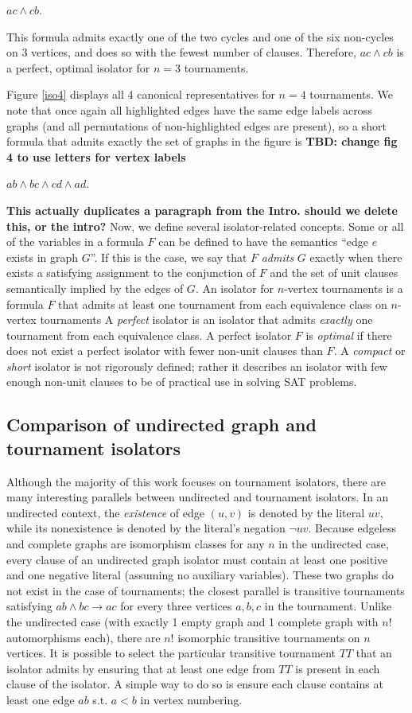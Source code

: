 \documentclass[conference]{IEEEtran}
\begin{document}
$ac \land cb$.

This formula admits exactly one of the two cycles and one of the six non-cycles on 3 vertices, and does so with the fewest number of clauses. Therefore, $ac \land cb$ is a perfect, optimal isolator for $n=3$ tournaments.

Figure \ref{iso4} displays all 4 canonical representatives for $n=4$ tournaments. We note that once again all highlighted edges have the same edge labels across graphs (and all permutations of non-highlighted edges are present), so a short formula that admits exactly the set of graphs in the figure is \textbf{TBD: change fig 4 to use letters for vertex labels}

$ab \land bc \land cd \land ad$.


\textbf{This actually duplicates a paragraph from the Intro. should we delete this, or the intro?}
Now, we define several isolator-related concepts.
Some or all of the variables in a formula $F$ can be defined to have the semantics ``edge $e$ exists in graph $G$''. If this is the case, we say that $F$ \emph{admits} $G$ exactly when there exists a satisfying assignment to the conjunction of $F$ and the set of unit clauses semantically implied by the edges of $G$.
An isolator for $n$-vertex tournaments is a formula $F$ that admits at least one tournament from each equivalence class on $n$-vertex tournaments
A \emph{perfect} isolator is an isolator that admits \textit{exactly} one tournament from each equivalence class.
A perfect isolator $F$ is \emph{optimal} if there does not exist a perfect isolator with fewer non-unit clauses than $F$.
A \emph{compact} or \emph{short} isolator is not rigorously defined; rather it describes an isolator with few enough non-unit clauses to be of practical use in solving SAT problems.


\subsection{Comparison of undirected graph and tournament isolators}

Although the majority of this work focuses on tournament isolators, there are many interesting parallels between undirected and tournament isolators. In an undirected context, the \emph{existence} of edge $(u,v)$ is denoted by the literal $uv$, while its nonexistence is denoted by the literal's negation $\lnot uv$.
Because edgeless and complete graphs are isomorphism classes for any $n$ in the undirected case, every clause of an undirected graph isolator must contain at least one positive and one negative literal (assuming no auxiliary variables). These two graphs do not exist in the case of tournaments; the closest parallel is transitive tournaments satisfying $ab \land bc \rightarrow ac$ for every three vertices $a,b,c$ in the tournament. Unlike the undirected case (with exactly 1 empty graph and 1 complete graph with $n!$ automorphisms each), there are $n!$ isomorphic transitive tournaments on $n$ vertices. It is possible to select the particular transitive tournament $TT$ that an isolator admits by ensuring that at least one edge from $TT$ is present in each clause of the isolator. A simple way to do so is ensure each clause contains at least one edge $ab$ s.t. $a<b$ in vertex numbering. 
\end{document}

